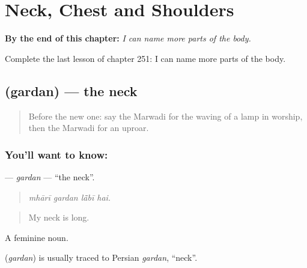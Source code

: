 
\chapter{Neck, Chest and Shoulders}
\label{ch:mw-neck-chest-and-shoulders}

\begin{chapteropening}
\textbf{By the end of this chapter:} \emph{I can name more parts of the body.}

Complete the last lesson of chapter 251: I can name more parts of the body.
\end{chapteropening}

\section[\texorpdfstring{\mw{गरदन} (gardan)}{गरदन (gardan)}]{ (gardan) — the neck}

\label{lesson:MW-C251-gardan}



\begin{quote}
Before the new one: say the Marwadi for the waving of a lamp in worship, then the Marwadi for an uproar.
\end{quote}

\subsection*{You'll want to know: }
\textbf{} — \emph{gardan} — \textquotedblleft{}the neck\textquotedblright{}.

\begin{quote}
   
\end{quote}

\begin{quote}
\emph{mhārī gardan lā̃bī hai.}
\end{quote}

\begin{quote}
My neck is long.
\end{quote}

A feminine noun.

\begin{cousinweb}
\textbf{} (\emph{gardan}) is usually traced to Persian \emph{gardan}, \textquotedblleft{}neck\textquotedblright{}.
\end{cousinweb}

